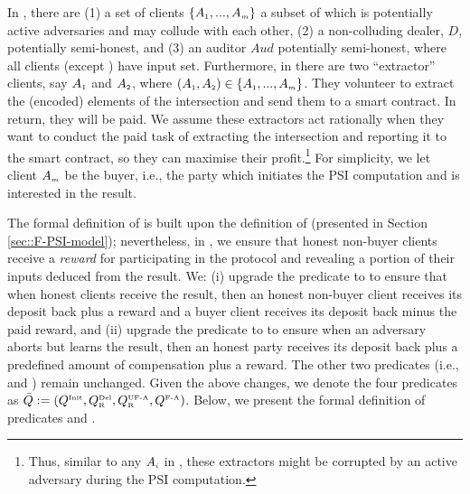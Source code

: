 In \ep, there are (1) a set of clients $\{A_{\scriptscriptstyle 1},...,A_{\scriptscriptstyle m}\}$ a subset of which is potentially active adversaries and may collude with each other, (2) a non-colluding dealer, $D$, potentially semi-honest, and (3) an auditor $Aud$ potentially semi-honest, where all clients (except \aud) have input set. Furthermore,  in \ep  there are two ``extractor'' clients, say $A_{\scriptscriptstyle 1}$ and $A_{\scriptscriptstyle 2}$, where $(A_{\scriptscriptstyle 1},A_{\scriptscriptstyle 2})\in \{A_{\scriptscriptstyle 1},...,A_{\scriptscriptstyle m}\}$. They volunteer to extract the (encoded) elements of the intersection and send them to a smart contract. In return, they will be paid. 
%
%
We assume these extractors act rationally when they want to conduct the paid task of extracting the intersection and reporting it to the smart contract, so they can maximise their profit.\footnote{Thus, similar to any $A_{\scriptscriptstyle i}$ in \p, these extractors might be corrupted by an active adversary during the PSI computation.} For simplicity, we let client $A_{\scriptscriptstyle m}$ be the buyer, i.e., the party which initiates the PSI computation and is interested in the result. 


 The formal definition of \ep is built upon the definition of \p (presented in Section \ref{sec::F-PSI-model}); nevertheless, in \ep, we ensure that honest non-buyer clients receive a \emph{reward} for participating in the protocol and revealing a portion of their inputs deduced from the result. We:  (i)  upgrade the predicate \qdel to  \qdelwr to ensure that when honest clients receive the result, then an honest non-buyer client receives its deposit back plus a reward and a buyer client receives its deposit back minus the paid reward, and (ii) upgrade the predicate  \qUnFAbt to \qUnFAbtwr to ensure when an adversary aborts but learns the result, then an honest party receives its deposit back plus a predefined amount of compensation plus a reward.  The other two predicates (i.e., \qinit and \qFAbt) remain unchanged. Given the above changes, we denote the four predicates as $\bar Q:=(Q^{\scriptscriptstyle \text{Init}},  Q^{\scriptscriptstyle \text{Del}}_{\scriptscriptstyle\text{R}}, Q^{\scriptscriptstyle \text{UF-A}}_{\scriptscriptstyle \text{R}}, Q^{\scriptscriptstyle \text{F-A}})$. Below, we present the formal definition of predicates \qdelwr and \qUnFAbtwr. 
 
 



